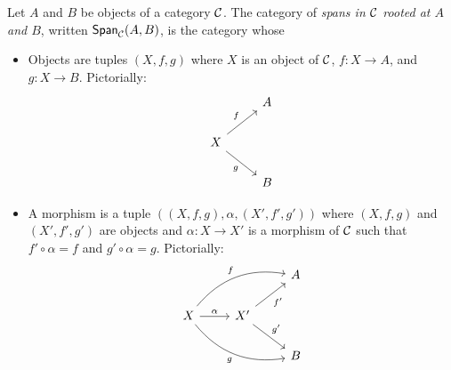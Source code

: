 \begin{definition}
  \sloppy
  Let \(A\) and \(B\) be objects of a category \(\mathcal C\).
The category of \emph{spans in \(\mathcal C\) rooted at \(A\) and \(B\)},
written \(\mathsf{Span}_\mathcal C(A,B)\),
is the category whose
\begin{itemize}
  \item Objects are tuples \((X,f,g)\)
    where \(X\) is an object of \(\mathcal C\),
    \(f : X \to A\), and \(g : X \to B\).
    Pictorially:
    \[%
\begin{tikzcd}
                                   & A \\
X \arrow[rd, "g"'] \arrow[ru, "f"] &   \\
                                   & B
\end{tikzcd}\]
  \item A morphism is a tuple
    \(((X,f,g),\alpha,(X',f',g'))\)
    where \((X,f,g)\) and  \((X',f',g')\)
    are objects and \(\alpha : X \to X'\)
    is a morphism of \(\mathcal C\)
    such that \(f' \circ \alpha = f\)
    and \(g' \circ \alpha = g\).
    Pictorially:
    \[%
\begin{tikzcd}
                                                                                &                                       & A \\
X \arrow[rrd, "g"', bend right] \arrow[rru, "f", bend left] \arrow[r, "\alpha"] & X' \arrow[ru, "f'"'] \arrow[rd, "g'"] &   \\
                                                                                &                                       & B
\end{tikzcd}\]


\end{itemize}
\end{definition}
